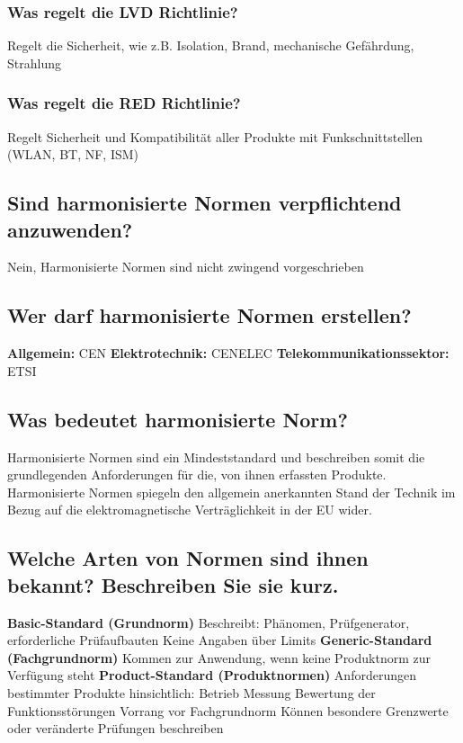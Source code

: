 \subsubsection{Was regelt die LVD Richtlinie?}
Regelt die Sicherheit, wie z.B. Isolation, Brand, mechanische Gefährdung, Strahlung

\subsubsection{Was regelt die RED Richtlinie?}
Regelt Sicherheit und Kompatibilität aller Produkte mit Funkschnittstellen (WLAN, BT, NF, ISM)

\subsection{Sind harmonisierte Normen verpflichtend anzuwenden?}
Nein, Harmonisierte Normen sind nicht zwingend vorgeschrieben

\subsection{Wer darf harmonisierte Normen erstellen?}
\begin{outline}
  \1 \textbf{Allgemein:} CEN
  \1 \textbf{Elektrotechnik:} CENELEC
  \1 \textbf{Telekommunikationssektor:} ETSI
\end{outline}

\subsection{Was bedeutet harmonisierte Norm?}
Harmonisierte Normen sind ein Mindeststandard und beschreiben somit die grundlegenden Anforderungen für die, von ihnen erfassten Produkte.\p
Harmonisierte Normen spiegeln den allgemein anerkannten Stand der Technik im Bezug auf die elektromagnetische Verträglichkeit in der EU wider.

\subsection{Welche Arten von Normen sind ihnen bekannt? Beschreiben Sie sie kurz.}
\begin{outline}
  \1 \textbf{Basic-Standard (Grundnorm)}
    \2 Beschreibt: Phänomen, Prüfgenerator, erforderliche Prüfaufbauten
    \2 Keine Angaben über Limits
  \1 \textbf{Generic-Standard (Fachgrundnorm)}
    \2 Kommen zur Anwendung, wenn keine Produktnorm zur Verfügung steht
  \1 \textbf{Product-Standard (Produktnormen)}
    \2 Anforderungen bestimmter Produkte hinsichtlich:
      \3 Betrieb
      \3 Messung
      \3 Bewertung der Funktionsstörungen
    \2 Vorrang vor Fachgrundnorm
    \2 Können besondere Grenzwerte oder veränderte Prüfungen beschreiben
\end{outline}

\pagebreak